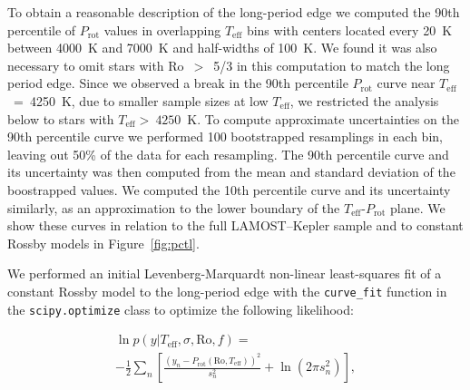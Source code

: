 \documentclass[twocolumn]{aastex631}
\newcommand{\teff}{\ensuremath{T_{\mathrm{eff}}}\xspace}
\newcommand{\prot}{\ensuremath{P_\mathrm{rot}}\xspace}
\begin{document}
To obtain a reasonable description of the long-period edge we computed the 90th percentile of \prot values in overlapping \teff bins with centers located every 20~K between 4000~K and 7000~K and half-widths of 100~K. We found it was also necessary to omit stars with Ro~$>$~5/3 in this computation to match the long period edge. Since we observed a break in the 90th percentile \prot curve near \teff~=~4250~K, due to smaller sample sizes at low \teff, we restricted the analysis below to stars with \teff$>~4250$~K. To compute approximate uncertainties on the 90th percentile curve we performed 100 bootstrapped resamplings in each bin, leaving out 50\% of the data for each resampling. The 90th percentile curve and its uncertainty was then computed from the mean and standard deviation of the boostrapped values. We computed the 10th percentile curve and its uncertainty similarly, as an approximation to the lower boundary of the \teff-\prot plane. We show these curves in relation to the full LAMOST--Kepler sample and to constant Rossby models in Figure~\ref{fig:pctl}.

\iffalse
\begin{figure}
    \centering
    \texttt{[image: pctl-curves.pdf]}
    \caption{At top, The LAMOST--Kepler sample and the 10th and 90th \prot percentiles, computed as described in \S\ref{subsec:rossby}. At bottom, the same curves are shown in relation to fiducial constant Rossby models.}
    \label{fig:pctl}
\end{figure}
\fi 



We performed an initial Levenberg-Marquardt non-linear least-squares fit of a constant Rossby model to the long-period edge with the \texttt{curve\_fit} function in the \texttt{scipy.optimize} class to optimize the following likelihood: 

\begin{multline}
    \ln{p} (y | T_\mathrm{eff}, \sigma, \mathrm{Ro}, f) =\\ -\frac{1}{2}\sum_n \left [ \frac{(y_n - P_\mathrm{rot}(\mathrm{Ro}, T_\mathrm{eff}))^2}{s_n^2}  + \ln{(2\pi s_n^2)} \right ],
\end{multline}
\end{document}
